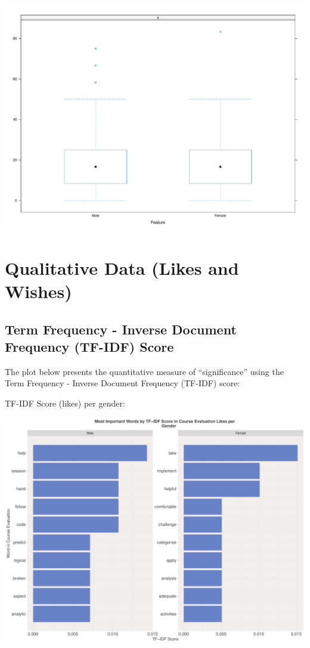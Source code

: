 \documentclass[
]{article}
\begin{document}
\includegraphics{AnalysisOfCourseEvaluation-Notebook_files/figure-latex/AbsenteeismBoxandWhiskerGender-1.pdf}

\newpage

\section{Qualitative Data (Likes and
Wishes)}\label{qualitative-data-likes-and-wishes}

\subsection{Term Frequency - Inverse Document Frequency (TF-IDF)
Score}\label{term-frequency---inverse-document-frequency-tf-idf-score}

The plot below presents the quantitative measure of ``significance''
using the Term Frequency - Inverse Document Frequency (TF-IDF) score:

TF-IDF Score (likes) per gender:

\includegraphics{AnalysisOfCourseEvaluation-Notebook_files/figure-latex/TF-IDFLikesPerGender-1.pdf}
\end{document}
